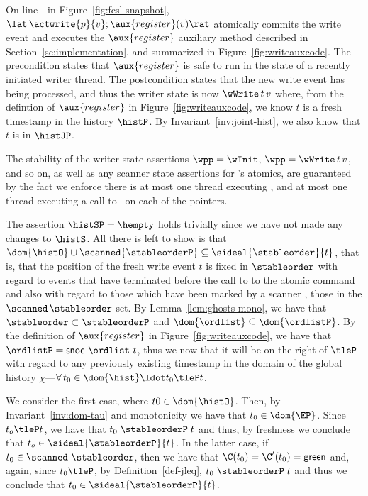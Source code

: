 On line~\lineWrtWrt~in Figure~\ref{fig:fcsl-snapshot},
$\lat\,\actwrite{p}{v}; \aux{register}(v)\rat$ atomically commits the
write event and executes the $\aux{register}$ auxiliary method
described in Section~\ref{sc:implementation}, and summarized in
Figure~\ref{fig:writeauxcode}. The precondition states that
$\aux{register}$ is safe to run in the state of a recently initiated
writer thread. The postcondition states that the new write event has
being processed, and thus the writer state is now $\wWrite\, t\, v$
where, from the defintion of $\aux{register}$ in
Figure~\ref{fig:writeauxcode}, we know $t$ is a fresh timestamp in the
history $\histP$. By Invariant~\ref{inv:joint-hist}, we also know
that $t$ is in $\histJP$.


The stability of the writer state assertions $\wpp = \wInit$, $\wpp
= \wWrite\, t\, v$, and so on, as well as any scanner state assertions
for \jyscan's atomics, are guaranteed by the fact we enforce there is
at most one thread executing \jyscan, and at most one thread executing
a call to \jywrite~on each of the pointers.
%

The assertion $\histSP = \hempty$ holds trivially since we have not
made any changes to $\histS$. All there is left to show is that $
\dom{\histO} \cup \scanned{\stableorderP} \subseteq
\sideal{\stableorder}{t}$, that is, that the position of the fresh
write event $t$ is fixed in $\stableorder$ with regard to events that
have terminated before the call to to the atomic command and also with
regard to those which have been marked by a scanner \ie, those in the
$\scanned\, \stableorder$ set. By Lemma~\ref{lem:ghosts-mono}, we have
that $\stableorder \subset \stableorderP$ and $\dom{\ordlist}
\subseteq \dom{\ordlistP}$. By the definition of $\aux{register}$ in
Figure~\ref{fig:writeauxcode}, we have that $\ordlistP =
\mathsf{snoc}\ {\ordlist}\ t$, thus we now that it will be on the
right of $\tleP$ with regard to any previously existing timestamp in
the domain of the global history $\chi$---\ie $\forall\, t_0 \in
\dom{\hist}\ldot t_0 \tleP t$.

We consider the first case, where $t0 \in \dom{\histO}$. Then, by
Invariant~\ref{inv:dom-tau} and monotonicity we have that $t_0 \in
\dom{\EP}$. Since $t_o \tleP t$, we have that $ t_0
\mathrel{\stableorderP} t$ and thus, by freshness we conclude that
$t_o \in \sideal{\stableorderP}{t}$. In the latter case, if $ t_0 \in
\scanned\ \stableorder$, then we have that $\C (t_0) = \C' (t_0) =
\mathsf{green}$ and, again, since $t_0 \tleP$, by
Definition~\ref{def-jleq}, $t_0 \mathrel{\stableorderP} t$ and thus we
conclude that $ t_0 \in \sideal{\stableorderP}{t}$.

